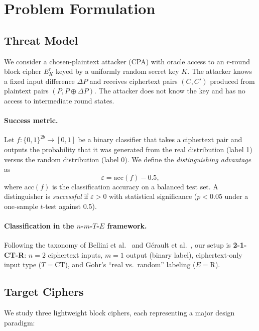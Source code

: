 \section{Problem Formulation}
\label{sec:problem}

\subsection{Threat Model}

We consider a chosen-plaintext attacker (CPA) with oracle access to an $r$-round block cipher $E^r_K$ keyed by a uniformly random secret key $K$.
The attacker knows a fixed input difference $\Delta P$ and receives ciphertext pairs $(C, C')$ produced from plaintext pairs $(P, P \oplus \Delta P)$.
The attacker does not know the key and has no access to intermediate round states.

\paragraph{Success metric.}
Let $f: \{0,1\}^{2b} \to [0,1]$ be a binary classifier that takes a ciphertext pair and outputs the probability that it was generated from the real distribution (label 1) versus the random distribution (label 0).
We define the \emph{distinguishing advantage} as
\begin{equation}
  \varepsilon = \mathrm{acc}(f) - 0.5,
\end{equation}
where $\mathrm{acc}(f)$ is the classification accuracy on a balanced test set.
A distinguisher is \emph{successful} if $\varepsilon > 0$ with statistical significance ($p < 0.05$ under a one-sample $t$-test against 0.5).

\paragraph{Classification in the $n$-$m$-$T$-$E$ framework.}
Following the taxonomy of Bellini et al.~\citep{bellini2023dbitnet} and Gérault et al.~\citep{gerault2024sok}, our setup is \textbf{2-1-CT-R}: $n=2$ ciphertext inputs, $m=1$ output (binary label), ciphertext-only input type ($T=\text{CT}$), and Gohr's ``real vs.\ random'' labeling ($E=\text{R}$).

\subsection{Target Ciphers}

We study three lightweight block ciphers, each representing a major design paradigm:

